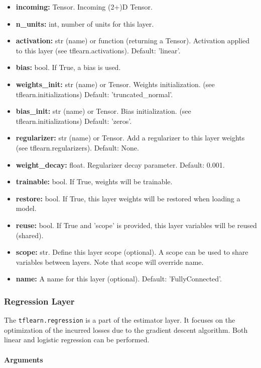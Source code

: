 \begin{itemize}
    \item \textbf{incoming:} Tensor. Incoming (2+)D Tensor.
    \item \textbf{n\_units:} int, number of units for this layer.
    \item \textbf{activation:} str (name) or function (returning a Tensor). Activation applied to this layer (see tflearn.activations). Default: 'linear'.
    \item \textbf{bias:} bool. If True, a bias is used.
    \item \textbf{weights\_init:} str (name) or Tensor. Weights initialization. (see tflearn.initializations) Default: 'truncated\_normal'.
    \item \textbf{bias\_init:} str (name) or Tensor. Bias initialization. (see tflearn.initializations) Default: 'zeros'.
    \item \textbf{regularizer:} str (name) or Tensor. Add a regularizer to this layer weights (see tflearn.regularizers). Default: None.
    \item \textbf{weight\_decay:} float. Regularizer decay parameter. Default: 0.001.
    \item \textbf{trainable:} bool. If True, weights will be trainable.
    \item \textbf{restore:} bool. If True, this layer weights will be restored when loading a model.
    \item \textbf{reuse:} bool. If True and 'scope' is provided, this layer variables will be reused (shared).
    \item \textbf{scope:} str. Define this layer scope (optional). A scope can be used to share variables between layers. Note that scope will override name.
    \item \textbf{name:} A name for this layer (optional). Default: 'FullyConnected'.    
\end{itemize}

\subsubsection{Regression Layer}

The \texttt{tflearn.regression} is a part of the estimator layer. It focuses on the optimization of the incurred losses due to the gradient descent algorithm. Both linear and logistic regression can be performed.

\paragraph{Arguments}

